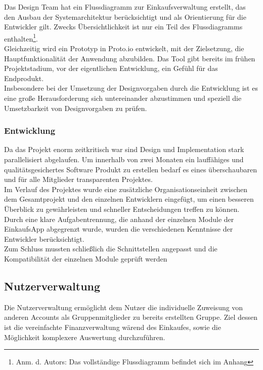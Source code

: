 \documentclass[12pt,a4paper]{article}
\begin{document}
\normalsize
Das Design Team hat ein Flussdiagramm zur Einkaufsverwaltung erstellt, das den Ausbau der Systemarchitektur berücksichtigt und als Orientierung für die Entwickler gilt. Zwecks Übersichtlichkeit ist nur ein Teil des Flussdiagramms enthalten\footnote {Anm. d. Autors: Das vollständige Flussdiagramm befindet sich im Anhang}. 
\\
Gleichzeitig wird ein Prototyp in Proto.io entwickelt, mit der Zielsetzung, die Hauptfunktionalität der Anwendung abzubilden. Das Tool gibt bereits im frühen Projektstadium, vor der eigentlichen Entwicklung, ein Gefühl für das Endprodukt.
\\
Insbesondere bei der Umsetzung der Designvorgaben durch die Entwicklung ist es eine große Herausforderung sich untereinander abzustimmen und speziell die Umsetzbarkeit von Designvorgaben zu prüfen. 

\subsubsection*{Entwicklung}
Da das Projekt enorm zeitkritisch war sind Design und Implementation stark parallelisiert abgelaufen. Um innerhalb von zwei Monaten ein lauffähiges und qualitätsgesichertes Software Produkt zu erstellen bedarf es eines überschaubaren und für alle Mitglieder transparenten Projektes.
\\
Im Verlauf des Projektes wurde eine zusätzliche Organisationseinheit zwischen dem Gesamtprojekt und den einzelnen Entwicklern eingefügt, um einen besseren Überblick zu gewährleisten und schneller Entscheidungen treffen zu können. 
\\
Durch eine klare Aufgabentrennung, die anhand der einzelnen Module der EinkaufsApp abgegrenzt wurde, wurden die verschiedenen Kenntnisse der Entwickler berücksichtigt. 
\\
Zum Schluss mussten schließlich die Schnittstellen angepasst und die Kompatibilität der einzelnen Module geprüft werden

\newpage
\subsection{Nutzerverwaltung}
Die Nutzerverwaltung ermöglicht dem Nutzer die individuelle Zuweisung von anderen Accounts als Gruppenmitglieder zu bereits erstellten Gruppe. Ziel dessen ist die vereinfachte Finanzverwaltung wärend des Einkaufes, sowie die Möglichkeit komplexere Auswertung durchzuführen.
\end{document}
